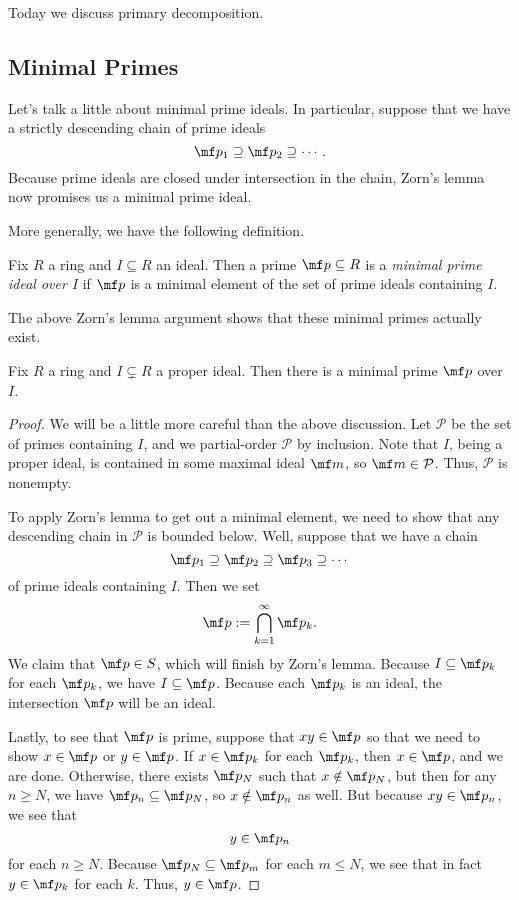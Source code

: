 
Today we discuss primary decomposition.

\subsection{Minimal Primes}

Let's talk a little about minimal prime ideals. In particular, suppose that we have a strictly descending chain of prime ideals
\[\mf p_1\supseteq\mf p_2\supseteq\cdots.\]
Because prime ideals are closed under intersection in the chain, Zorn's lemma now promises us a minimal prime ideal.

More generally, we have the following definition.
\begin{definition}
	Fix $R$ a ring and $I\subseteq R$ an ideal. Then a prime $\mf p\subseteq R$ is a \textit{minimal prime ideal over $I$} if $\mf p$ is a minimal element of the set of prime ideals containing $I$.
\end{definition}
The above Zorn's lemma argument shows that these minimal primes actually exist.
\begin{proposition} \label{prop:minprimeexist}
	Fix $R$ a ring and $I\subsetneq R$ a proper ideal. Then there is a minimal prime $\mf p$ over $I$.
\end{proposition}
\begin{proof}
	We will be a little more careful than the above discussion. Let $\mathcal P$ be the set of primes containing $I$, and we partial-order $\mathcal P$ by inclusion. Note that $I$, being a proper ideal, is contained in some maximal ideal $\mf m$, so $\mf m\in\mathcal P$. Thus, $\mathcal P$ is nonempty.

	To apply Zorn's lemma to get out a minimal element, we need to show that any descending chain in $\mathcal P$ is bounded below. Well, suppose that we have a chain
	\[\mf p_1\supseteq\mf p_2\supseteq\mf p_3\supseteq\cdots\]
	of prime ideals containing $I$. Then we set
	\[\mf p:=\bigcap_{k=1}^\infty\mf p_k.\]
	We claim that $\mf p\in S$, which will finish by Zorn's lemma. Because $I\subseteq\mf p_k$ for each $\mf p_k$, we have $I\subseteq\mf p$. Because each $\mf p_k$ is an ideal, the intersection $\mf p$ will be an ideal.
	
	Lastly, to see that $\mf p$ is prime, suppose that $xy\in\mf p$ so that we need to show $x\in\mf p$ or $y\in\mf p$. If $x\in\mf p_k$ for each $\mf p_k$, then $x\in\mf p$, and we are done. Otherwise, there exists $\mf p_N$ such that $x\notin\mf p_N$, but then for any $n\ge N$, we have $\mf p_n\subseteq\mf p_N$, so $x\notin\mf p_n$ as well. But because $xy\in\mf p_n$, we see that
	\[y\in\mf p_n\]
	for each $n\ge N$. Because $\mf p_N\subseteq\mf p_m$ for each $m\le N$, we see that in fact $y\in\mf p_k$ for each $k$. Thus, $y\in\mf p$.
\end{proof}

